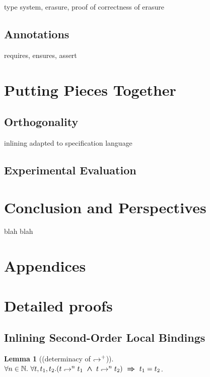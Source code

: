 \documentclass[a4paper,11pt,oneside]{article}
\theoremstyle{plain}
\newtheorem{lemma}[definition]{Lemma}
\newcommand{\bwedge}{\boldsymbol{~\wedge~}}
\newcommand{\brarr}{\boldsymbol{~\Rightarrow~}}
\newcommand{\hookdownarrow}{\mathrel{\rotatebox[origin=c]{180}{$\hookleftarrow$}}}
\newcommand{\inlletarr}{\hookdownarrow}
\newcommand{\inlletplus}{\hookdownarrow^{+}}
\begin{document}
type system, erasure, proof of correctness of erasure

\subsection{Annotations}

requires, ensures, assert

\section{Putting Pieces Together}

\subsection{Orthogonality}

inlining adapted to specification language

\subsection{Experimental Evaluation}

\section{Conclusion and Perspectives}

blah blah

\newpage
\section*{Appendices}
\newpage
\appendix
\section{Detailed proofs} 


	\subsection{Inlining Second-Order Local Bindings}
	

\begin{lemma}[(determinacy of $\inlletplus$)] 
	$\forall n \in \mathbb{N}.~ \forall t, t_1, t_2.
		(t \inlletarr^{n} {t_1} \bwedge t \inlletarr^{n} {t_2}) \brarr
			t_1 = t_2$.	
	\label{inllet-determ-p}	
\end{lemma}
\end{document}
